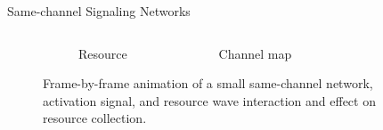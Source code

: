\begin{frame}{Same-channel Signaling Networks}

\begin{figure}

\begin{columns}
\end{columns}

\begin{columns}
\begin{column}{0.45\textwidth}
  \begin{subfigure}[b]{\textwidth}
  \caption{Resource}
  \end{subfigure}
\end{column}

\begin{column}{0.45\textwidth}
  \begin{subfigure}[b]{\textwidth}
  \caption{Channel map}
  \end{subfigure}
\end{column}

\begin{column}{0.1\textwidth}
  \begin{subfigure}[b]{\textwidth}
  \end{subfigure}
\end{column}

\end{columns}

\caption{
Frame-by-frame animation of a small same-channel network, activation signal, and resource wave interaction and effect on resource collection.
}

\end{figure}

\end{frame}

